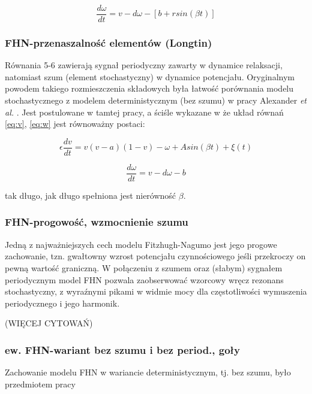 \documentclass[12pt]{article}
\begin{document}
  \begin{equation} \label{eq:w}
    \frac{d \omega}{dt} = v - d \omega - [b + r sin(\beta t)]
  \end{equation}

  

  \subsubsection{FHN-przenaszalność elementów (Longtin)}

  Równania 5-6 zawierają sygnał periodyczny zawarty w dynamice relaksacji, natomiast szum (element stochastyczny) w dynamice potencjału. Oryginalnym powodem takiego rozmieszczenia składowych była łatwość porównania modelu stochastycznego z modelem deterministycznym (bez szumu) w pracy Alexander \emph{et al.} \cite{alexander}. Jest postulowane w tamtej pracy, a ściśle wykazane w \cite{longtin} że układ równań \ref{eq:v}, \ref{eq:w} jest równoważny postaci:

  \begin{equation}
    \epsilon \frac{dv}{dt} = v(v-a)(1-v)- \omega + A sin(\beta t) + \xi(t)
  \end{equation}

  \begin{equation}
    \frac{d \omega}{dt} = v - d \omega - b
  \end{equation}

  tak długo, jak długo spełniona jest nierówność $\beta$.

  \subsubsection{FHN-progowość, wzmocnienie szumu}

  Jedną z najważniejszych cech modelu Fitzhugh-Nagumo jest jego progowe zachowanie, tzn. gwałtowny wzrost potencjału czynnościowego jeśli przekroczy on pewną wartość graniczną. W połączeniu z szumem oraz (słabym) sygnałem periodycznym model FHN pozwala zaobserwować wzorcowy wręcz rezonans stochastyczny, z wyraźnymi pikami w widmie mocy dla częstotliwości wymuszenia periodycznego i jego harmonik.

  (WIĘCEJ CYTOWAŃ)

  \subsubsection{ew. FHN-wariant bez szumu i bez period., goły}

  Zachowanie modelu FHN w wariancie deterministycznym, tj. bez szumu, było przedmiotem pracy \cite{alexander}
\end{document}
